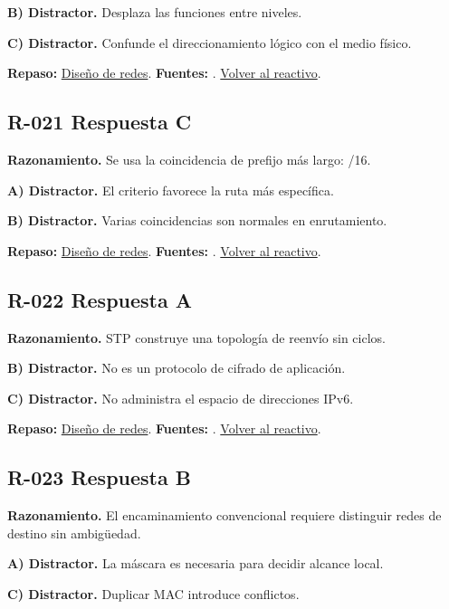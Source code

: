 \textbf{B) Distractor. }Desplaza las funciones entre niveles.

\textbf{C) Distractor. }Confunde el direccionamiento lógico con el medio físico.

\textbf{Repaso:} \hyperref[sec:r1]{Diseño de redes}. \textbf{Fuentes:} \cite{rfc8200,rfc4632,networks,vlan}. \hyperref[q:R-020]{Volver al reactivo}.\par\medskip

\subsection*{R-021 \quad Respuesta C}\label{s:R-021}
\textbf{Razonamiento.} Se usa la coincidencia de prefijo más largo: /16.

\textbf{A) Distractor. }El criterio favorece la ruta más específica.

\textbf{B) Distractor. }Varias coincidencias son normales en enrutamiento.

\textbf{Repaso:} \hyperref[sec:r1]{Diseño de redes}. \textbf{Fuentes:} \cite{rfc8200,rfc4632,networks,vlan}. \hyperref[q:R-021]{Volver al reactivo}.\par\medskip

\subsection*{R-022 \quad Respuesta A}\label{s:R-022}
\textbf{Razonamiento.} STP construye una topología de reenvío sin ciclos.

\textbf{B) Distractor. }No es un protocolo de cifrado de aplicación.

\textbf{C) Distractor. }No administra el espacio de direcciones IPv6.

\textbf{Repaso:} \hyperref[sec:r1]{Diseño de redes}. \textbf{Fuentes:} \cite{rfc8200,rfc4632,networks,vlan}. \hyperref[q:R-022]{Volver al reactivo}.\par\medskip

\subsection*{R-023 \quad Respuesta B}\label{s:R-023}
\textbf{Razonamiento.} El encaminamiento convencional requiere distinguir redes de destino sin ambigüedad.

\textbf{A) Distractor. }La máscara es necesaria para decidir alcance local.

\textbf{C) Distractor. }Duplicar MAC introduce conflictos.

